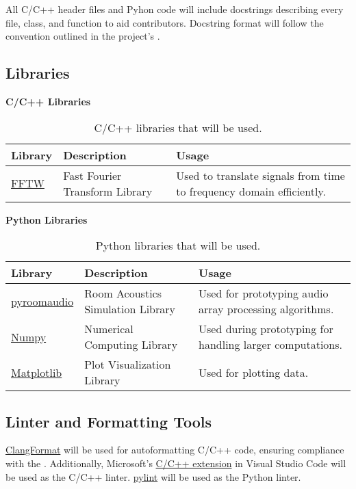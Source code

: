 \documentclass{article}
\begin{document}
All C/C++ header files and Pyhon code will include docstrings describing every file, class, and function to aid contributors.
Docstring format will follow the convention outlined in the project's .

\subsection{Libraries}

\textbf{C/C++ Libraries}
\begin{table}[h!]
\centering
\begin{tabularx}{\textwidth}{|l|X|X|}
\hline
\textbf{Library} & \textbf{Description} & \textbf{Usage} \\ \hline
\href{https://www.fftw.org/}{FFTW} & Fast Fourier Transform Library & Used to translate signals from time to frequency domain efficiently. \\ \hline
\end{tabularx}
\caption{C/C++ libraries that will be used.}
\end{table}

\textbf{Python Libraries}
\begin{table}[h!]
\centering
\begin{tabularx}{\textwidth}{|l|X|X|}
\hline
\textbf{Library} & \textbf{Description} & \textbf{Usage} \\ \hline
\href{https://pypi.org/project/pyroomacoustics/}{pyroomaudio} & Room Acoustics Simulation Library  & Used for prototyping audio array processing algorithms. \\ \hline
\href{https://numpy.org/}{Numpy} & Numerical Computing Library  & Used during prototyping for handling larger computations. \\ \hline
\href{https://matplotlib.org/}{Matplotlib} & Plot Visualization Library  & Used for plotting data. \\ \hline
\end{tabularx}
\caption{Python libraries that will be used.}
\end{table}

\subsection{Linter and Formatting Tools}

\href{https://clang.llvm.org/docs/ClangFormat.html}{ClangFormat} will be used for autoformatting C/C++ code, ensuring compliance with the .
Additionally, Microsoft’s \href{https://code.visualstudio.com/docs/languages/cpp}{C/C++ extension} in Visual Studio Code will be used as the C/C++ linter.
\href{https://pypi.org/project/pylint/}{pylint} will be used as the Python linter.
\end{document}
